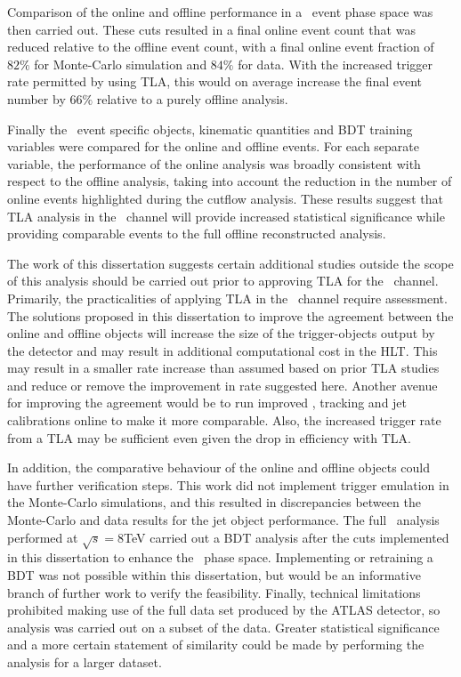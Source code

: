 Comparison of the online and offline performance in a \VBFHBB\ event phase space was then carried out. These cuts resulted in a final online event count that was reduced relative to the offline event count, with a final online event fraction of $82\%$ for Monte-Carlo simulation and $84\%$ for data. With the increased trigger rate permitted by using TLA, this would on average increase the final event number by $66\%$ relative to a purely offline analysis.

Finally the \VBFHBB\ event specific objects, kinematic quantities and BDT training variables were compared for the online and offline events. For each separate variable, the performance of the online analysis was broadly consistent with respect to the offline analysis, taking into account the reduction in the number of online events highlighted during the cutflow analysis. These results suggest that TLA analysis in the \VBFHBB\ channel will provide increased statistical significance while providing comparable events to the full offline reconstructed analysis.

The work of this dissertation suggests certain additional studies outside the scope of this analysis should be carried out prior to approving TLA for the \VBFHBB\ channel. Primarily, the practicalities of applying TLA in the \VBFHBB\ channel require assessment. The solutions proposed in this dissertation to improve the agreement between the online and offline objects will increase the size of the trigger-objects output by the detector and may result in additional computational cost in the HLT. This may result in a smaller rate increase than assumed based on prior TLA studies and reduce or remove the improvement in rate suggested here. Another avenue for improving the agreement would be to run improved \btag, tracking and jet calibrations online to make it more comparable. Also, the increased trigger rate from a TLA may be sufficient even given the drop in efficiency with TLA.

In addition, the comparative behaviour of the online and offline objects could have further verification steps. This work did not implement trigger emulation in the Monte-Carlo simulations, and this resulted in discrepancies between the Monte-Carlo and data results for the jet object performance. The full \VBFHBB\ analysis performed at $\sqrt{s}=8$TeV carried out a BDT analysis after the cuts implemented in this dissertation to enhance the \VBFHBB\ phase space. Implementing or retraining a BDT was not possible within this dissertation, but would be an informative branch of further work to verify the feasibility. Finally, technical limitations prohibited making use of the full data set produced by the ATLAS detector, so analysis was carried out on a subset of the data. Greater statistical significance and a more certain statement of similarity could be made by performing the analysis for a larger dataset.

